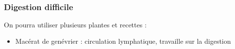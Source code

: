 \subsubsection{Digestion difficile}

On pourra utiliser plusieurs plantes et recettes : \\

\begin{itemize}[label = \faPen]
    \item Macérat de genévrier : circulation lymphatique, travaille sur la digestion
\end{itemize}